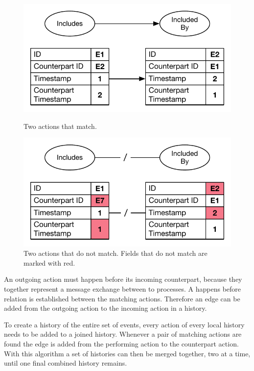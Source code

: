     \begin{figure}[H]
		\centering
		\begin{minipage}{0.45\textwidth}
			\centering
			\includegraphics[width=\textwidth]{4connect/images/actions-match.pdf}
		\caption{Two actions that match.}
		\label{fig:connect:actions-match}
		\end{minipage}\hfill
		\begin{minipage}{0.45\textwidth}
			\centering
			\includegraphics[width=\textwidth]{4connect/images/actions-do-not-match.pdf}
		\caption{Two actions that do not match. Fields that do not match are marked with red.}
		\label{fig:connect:actions-do-not-match}
		\end{minipage}
		\end{figure}
    
    \newpar An outgoing action must happen before its incoming counterpart, because they together represent a message exchange between to processes. A happens before relation is established between the matching actions. Therefore an edge can be added from the outgoing action to the incoming action in a history.

	\newpar To create a history of the entire set of events, every action of every local history needs to be added to a joined history. Whenever a pair of matching actions are found the edge is added from the performing action to the counterpart action. With this algorithm a set of histories can then be merged together, two at a time, until one final combined history remains.
	
